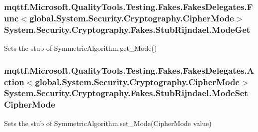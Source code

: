 \hypertarget{class_system_1_1_security_1_1_cryptography_1_1_fakes_1_1_stub_rijndael_ac252f1011d387aa49cc5703fbf50fae1}{
\subsubsection[{Mode\-Get}]{\setlength{\rightskip}{0pt plus 5cm}mqttf.\-Microsoft.\-Quality\-Tools.\-Testing.\-Fakes.\-Fakes\-Delegates.\-Func$<$global.\-System.\-Security.\-Cryptography.\-Cipher\-Mode$>$ System.\-Security.\-Cryptography.\-Fakes.\-Stub\-Rijndael.\-Mode\-Get}}\label{class_system_1_1_security_1_1_cryptography_1_1_fakes_1_1_stub_rijndael_ac252f1011d387aa49cc5703fbf50fae1}


Sets the stub of Symmetric\-Algorithm.\-get\-\_\-\-Mode()

\hypertarget{class_system_1_1_security_1_1_cryptography_1_1_fakes_1_1_stub_rijndael_a0360fc8f5b5f7c709a7d492cabc7ac87}{
\subsubsection[{Mode\-Set\-Cipher\-Mode}]{\setlength{\rightskip}{0pt plus 5cm}mqttf.\-Microsoft.\-Quality\-Tools.\-Testing.\-Fakes.\-Fakes\-Delegates.\-Action$<$global.\-System.\-Security.\-Cryptography.\-Cipher\-Mode$>$ System.\-Security.\-Cryptography.\-Fakes.\-Stub\-Rijndael.\-Mode\-Set\-Cipher\-Mode}}\label{class_system_1_1_security_1_1_cryptography_1_1_fakes_1_1_stub_rijndael_a0360fc8f5b5f7c709a7d492cabc7ac87}


Sets the stub of Symmetric\-Algorithm.\-set\-\_\-\-Mode(\-Cipher\-Mode value)

